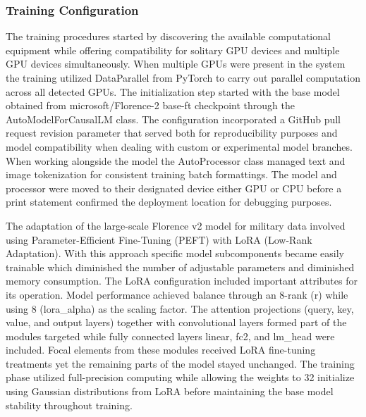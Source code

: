 \documentclass[fleqn,10pt,lineno]{wlpeerj}
\begin{document}
\subsubsection{Training Configuration}

The training procedures started by discovering the available computational equipment while offering compatibility for solitary GPU devices and multiple GPU devices simultaneously. When multiple GPUs were present in the system the training utilized DataParallel from PyTorch to carry out parallel computation across all detected GPUs. The initialization step started with the base model obtained from microsoft/Florence-2 base-ft checkpoint through the AutoModelForCausalLM class. The configuration incorporated a GitHub pull request revision parameter that served both for reproducibility purposes and model compatibility when dealing with custom or experimental model branches. When working alongside the model the AutoProcessor class managed text and image tokenization for consistent training batch formattings. The model and processor were moved to their designated device either GPU or CPU before a print statement confirmed the deployment location for debugging purposes. 

The adaptation of the large-scale Florence v2 model for military data involved using Parameter-Efficient Fine-Tuning (PEFT) with LoRA (Low-Rank Adaptation). With this approach specific model subcomponents became easily trainable which diminished the number of adjustable parameters and diminished memory consumption. The LoRA configuration included important attributes for its operation. Model performance achieved balance through an 8-rank (r) while using 8 (lora\_alpha) as the scaling factor. The attention projections (query, key, value, and output layers) together with convolutional layers formed part of the modules targeted while fully connected layers linear, fc2, and lm\_head were included. Focal elements from these modules received LoRA fine-tuning treatments yet the remaining parts of the model stayed unchanged. The training phase utilized full-precision computing while allowing the weights to 32 initialize using Gaussian distributions from LoRA before maintaining the base model stability throughout training.  
\end{document}
